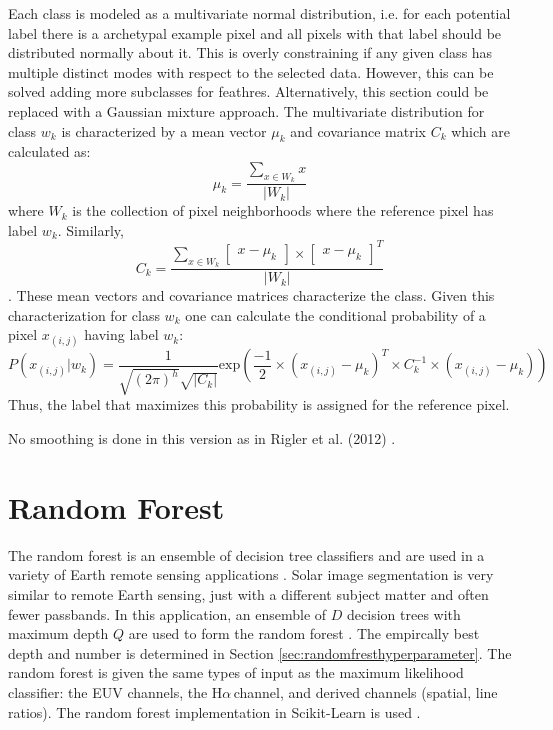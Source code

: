 \documentclass[twoside]{report}
\newcommand{\halpha}{H$\alpha$\,}
\newcommand{\todo}[1]{{\color{red}{\textbf{#1}}}}
\begin{document}
Each class is modeled as a multivariate normal distribution, i.e. for each potential label there is a archetypal example pixel and all pixels with that label should be distributed normally about it. This is overly constraining if any given class has multiple distinct modes with respect to the selected data. However, this can be solved adding more subclasses for feathres. Alternatively, this section could be replaced with a Gaussian mixture approach. The multivariate distribution for class $w_k$ is characterized by a mean vector $\mu_k$ and covariance matrix $C_k$ which are calculated as:
\[ \mu_k = \frac{\sum_{x \in W_k} x}{|W_k|} \]
where $W_k$ is the collection of pixel neighborhoods where the reference pixel has label $w_k$. Similarly,
\[ C_k = \frac{\sum_{x \in W_k} \begin{bmatrix} x - \mu_k \end{bmatrix} \times \begin{bmatrix} x - \mu_k \end{bmatrix}^T}{|W_k|} \].
These mean vectors and covariance matrices characterize the class. Given this characterization for class $w_k$ one can calculate the conditional probability of a pixel $x_{(i,j)}$ having label $w_k$:
\[ P(x_{(i,j)} | w_k) = \frac{1}{\sqrt{(2 \pi)^h} \sqrt{|C_k|}} \mathrm{exp} \left( \frac{-1}{2} \times \left(x_{(i,j)} - \mu_k \right)^T \times C_k^{-1} \times \left(x_{(i,j)} - \mu_k \right) \right) \]
Thus, the label that maximizes this probability is assigned for the reference pixel.

No smoothing is done in this version as in Rigler et al. (2012) \cite{rigler:2012}. 

\section{Random Forest}
The random forest is an ensemble of decision tree classifiers and are used in a variety of Earth remote sensing applications \cite{puissant2014object, salas2016multispectral, clark2016mapping, kulkarni2017multispectral, lowe:2015}. Solar image segmentation is very similar to remote Earth sensing, just with a different subject matter and often fewer passbands. In this application, an ensemble of $D$ decision trees with maximum depth $Q$ are used to form the random forest \todo{change to optimal}. The empircally best depth and number is determined in Section \ref{sec:randomfresthyperparameter}. The random forest is given the same types of input as the maximum likelihood classifier: the EUV channels, the \halpha channel, and derived channels (spatial, line ratios). The random forest implementation in Scikit-Learn is used \cite{scikit-learn}. 
\end{document}
